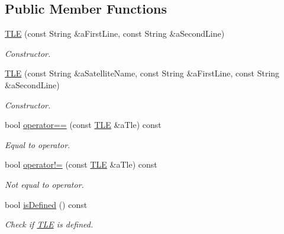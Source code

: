 \subsection*{Public Member Functions}
\begin{DoxyCompactItemize}
\item 
\hyperlink{classlibrary_1_1astro_1_1trajectory_1_1orbit_1_1models_1_1sgp4_1_1_t_l_e_a4d2b43f02cef44f0c9635daf9946261c}{T\+LE} (const String \&a\+First\+Line, const String \&a\+Second\+Line)
\begin{DoxyCompactList}\small\item\em Constructor. \end{DoxyCompactList}\item 
\hyperlink{classlibrary_1_1astro_1_1trajectory_1_1orbit_1_1models_1_1sgp4_1_1_t_l_e_ad7e682350d9ed071f254efbfacc1bc07}{T\+LE} (const String \&a\+Satellite\+Name, const String \&a\+First\+Line, const String \&a\+Second\+Line)
\begin{DoxyCompactList}\small\item\em Constructor. \end{DoxyCompactList}\item 
bool \hyperlink{classlibrary_1_1astro_1_1trajectory_1_1orbit_1_1models_1_1sgp4_1_1_t_l_e_aa32fc4cf4703d3137da14da72f7dc684}{operator==} (const \hyperlink{classlibrary_1_1astro_1_1trajectory_1_1orbit_1_1models_1_1sgp4_1_1_t_l_e}{T\+LE} \&a\+Tle) const
\begin{DoxyCompactList}\small\item\em Equal to operator. \end{DoxyCompactList}\item 
bool \hyperlink{classlibrary_1_1astro_1_1trajectory_1_1orbit_1_1models_1_1sgp4_1_1_t_l_e_a92dd1db5b23bbb86f46960c830dcdae3}{operator!=} (const \hyperlink{classlibrary_1_1astro_1_1trajectory_1_1orbit_1_1models_1_1sgp4_1_1_t_l_e}{T\+LE} \&a\+Tle) const
\begin{DoxyCompactList}\small\item\em Not equal to operator. \end{DoxyCompactList}\item 
bool \hyperlink{classlibrary_1_1astro_1_1trajectory_1_1orbit_1_1models_1_1sgp4_1_1_t_l_e_a5098ce1a95f5bcab8398abcf5f3c7101}{is\+Defined} () const
\begin{DoxyCompactList}\small\item\em Check if \hyperlink{classlibrary_1_1astro_1_1trajectory_1_1orbit_1_1models_1_1sgp4_1_1_t_l_e}{T\+LE} is defined. \end{DoxyCompactList}\item 

\end{DoxyCompactItemize}
